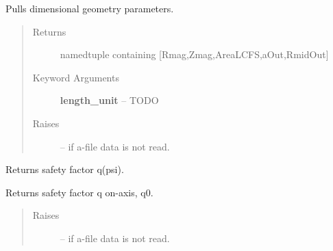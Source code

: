 \documentclass[letterpaper,10pt,english]{sphinxmanual}
\begin{document}
\begin{fulllineitems}
\begin{fulllineitems}
\end{fulllineitems}


\begin{fulllineitems}
\label{eqtools:eqtools.eqdskreader.EqdskReader.getGeometry}
Pulls dimensional geometry parameters.
\begin{quote}\begin{description}
\item[{Returns}] \leavevmode
namedtuple containing {[}Rmag,Zmag,AreaLCFS,aOut,RmidOut{]}

\item[{Keyword Arguments}] \leavevmode
\textbf{length\_unit} --
TODO

\item[{Raises }] \leavevmode
{} -- 
if a-file data is not read.

\end{description}\end{quote}

\end{fulllineitems}


\begin{fulllineitems}
\label{eqtools:eqtools.eqdskreader.EqdskReader.getQProfile}
Returns safety factor q(psi).

\end{fulllineitems}


\begin{fulllineitems}
\label{eqtools:eqtools.eqdskreader.EqdskReader.getQ0}
Returns safety factor q on-axis, q0.
\begin{quote}\begin{description}
\item[{Raises }] \leavevmode
{} -- 
if a-file data is not read.

\end{description}\end{quote}

\end{fulllineitems}



\end{fulllineitems}
\end{document}
